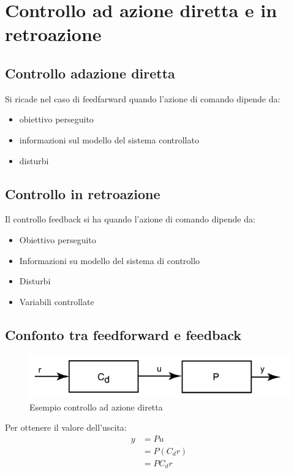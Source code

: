 
\section{Controllo ad azione diretta e in retroazione}
\subsection{Controllo adazione diretta}
Si ricade nel caso di feedfarward quando l'azione di comando dipende da:
\begin{itemize}
  \item obiettivo perseguito
  \item informazioni sul modello del sistema controllato
  \item disturbi
\end{itemize}

\subsection{Controllo in retroazione}
Il controllo feedback si ha quando l'azione di comando dipende da:
\begin{itemize}
  \item Obiettivo perseguito
  \item Informazioni su modello del sistema di controllo
  \item Disturbi
  \item Variabili controllate
\end{itemize}


\subsection{Confonto tra feedforward e feedback}

\begin{figure}[h!]
  \centering
  \includegraphics[width=0.5\linewidth]{./images/controllo_azione_diretta.png}
  \caption{Esempio controllo ad azione diretta}
  \label{fig:feedforward}
\end{figure}

Per ottenere il valore dell'uscita:
\begin{align*}
  y &= Pu \\
    &= P(C_dr) \\
    &= PC_dr \\
\end{align*}

